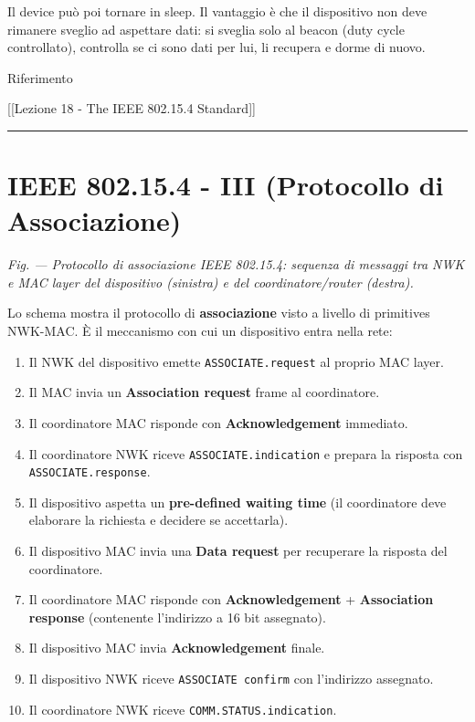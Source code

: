 \documentclass[
  italian,
  openany]{book}
\providecommand{\tightlist}{%
  \setlength{\itemsep}{0pt}\setlength{\parskip}{0pt}}
\begin{document}
Il device può poi tornare in sleep. Il vantaggio è che il dispositivo
non deve rimanere sveglio ad aspettare dati: si sveglia solo al beacon
(duty cycle controllato), controlla se ci sono dati per lui, li recupera
e dorme di nuovo.

\begin{calloutnote}{Riferimento}

{[}{[}Lezione 18 - The IEEE 802.15.4 Standard{]}{]}

\end{calloutnote}

\begin{center}\rule{0.5\linewidth}{0.5pt}\end{center}

\section{IEEE 802.15.4 - III (Protocollo di
Associazione)}\label{ieee-802.15.4---iii-protocollo-di-associazione}

\emph{Fig. --- Protocollo di associazione IEEE 802.15.4: sequenza di
messaggi tra NWK e MAC layer del dispositivo (sinistra) e del
coordinatore/router (destra).}

Lo schema mostra il protocollo di \textbf{associazione} visto a livello
di primitives NWK-MAC. È il meccanismo con cui un dispositivo entra
nella rete:

\begin{enumerate}
\def\labelenumi{\arabic{enumi}.}
\tightlist
\item
  Il NWK del dispositivo emette \texttt{ASSOCIATE.request} al proprio
  MAC layer.
\item
  Il MAC invia un \textbf{Association request} frame al coordinatore.
\item
  Il coordinatore MAC risponde con \textbf{Acknowledgement} immediato.
\item
  Il coordinatore NWK riceve \texttt{ASSOCIATE.indication} e prepara la
  risposta con \texttt{ASSOCIATE.response}.
\item
  Il dispositivo aspetta un \textbf{pre-defined waiting time} (il
  coordinatore deve elaborare la richiesta e decidere se accettarla).
\item
  Il dispositivo MAC invia una \textbf{Data request} per recuperare la
  risposta del coordinatore.
\item
  Il coordinatore MAC risponde con \textbf{Acknowledgement} +
  \textbf{Association response} (contenente l'indirizzo a 16 bit
  assegnato).
\item
  Il dispositivo MAC invia \textbf{Acknowledgement} finale.
\item
  Il dispositivo NWK riceve \texttt{ASSOCIATE\ confirm} con l'indirizzo
  assegnato.
\item
  Il coordinatore NWK riceve \texttt{COMM.STATUS.indication}.
\end{enumerate}
\end{document}
